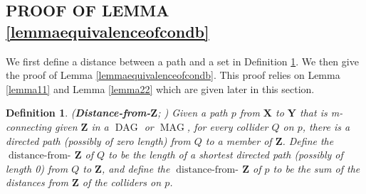 \documentclass[]{article}
\DeclareMathOperator{\DAG}{DAG}
\DeclareMathOperator{\MAG}{MAG}
\DeclareMathOperator{\distancefrom}{distance-from-\!}
\newtheorem{definition}[theorem]{Definition}
\theoremstyle{definition}
\theoremstyle{remark}
\begin{document}
\subsection{PROOF OF LEMMA \ref{lemmaequivalenceofcondb}} \label{sec: eq of condition b}

We first define a distance between a path and a set in Definition \ref{defdistancefromC}. We then give the proof of Lemma \ref{lemmaequivalenceofcondb}. This proof relies on Lemma \ref{lemma11} and Lemma \ref{lemma22} which are given later in this section.

\begin{definition}
   (\textbf{Distance-from-$\mathbf{Z}$}; \citealp{zhang2006causal}) Given a path $p$ from $\mathbf{X}$ to $\mathbf{Y}$ that is m-connecting given $\mathbf{Z}$ in a $\DAG$ or $\MAG$, for every collider $Q$ on $p$, there is a directed path (possibly of zero length) from $Q$ to a member of $\mathbf{Z}$. Define the $\distancefrom{\mathbf{Z}}$ of $Q$ to be the length of a shortest directed path (possibly of length 0) from $Q$ to $\mathbf{Z}$, and define the $\distancefrom{\mathbf{Z}}$ of $p$ to be the sum of the distances from $\mathbf{Z}$ of the colliders on $p$.
   \label{defdistancefromC}
\end{definition}
\end{document}
